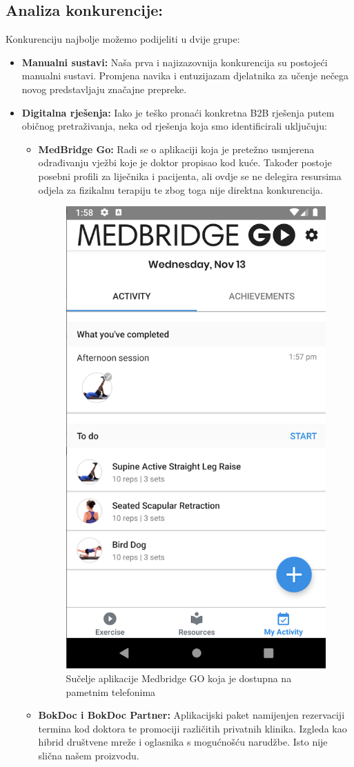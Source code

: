             \subsection*{Analiza konkurencije:} 
                Konkurenciju najbolje možemo podijeliti u dvije grupe: 
                \begin{itemize}
                    \item \textbf{Manualni sustavi:} Naša prva i najizazovnija konkurencija su postojeći manualni sustavi. Promjena navika i entuzijazam djelatnika za učenje nečega novog predstavljaju značajne prepreke.
                    \item \textbf{Digitalna rješenja:} Iako je teško pronaći konkretna B2B rješenja putem običnog pretraživanja, neka od rješenja koja smo identificirali uključuju:
                    \begin{itemize}
                        \item \textbf{MedBridge Go:} Radi se o aplikaciji koja je pretežno usmjerena odrađivanju vježbi koje je doktor propisao kod kuće. 
                        Također postoje posebni profili za liječnika i pacijenta, ali ovdje se ne delegira resursima odjela za fizikalnu terapiju te zbog toga nije direktna konkurencija. 
                        \begin{figure}[!h]
                            \centering
                            \includegraphics[width=0.35\linewidth]{slike/medbridge-go.png}
                            \caption{Sučelje aplikacije Medbridge GO koja je dostupna na pametnim telefonima}
                        \end{figure}
                        \item \textbf{BokDoc i BokDoc Partner:} Aplikacijski paket namijenjen rezervaciji termina kod doktora te promociji različitih privatnih klinika. Izgleda kao hibrid društvene mreže i oglasnika s mogućnošću narudžbe. Isto nije slična našem proizvodu. 

\end{itemize}
\end{itemize}
